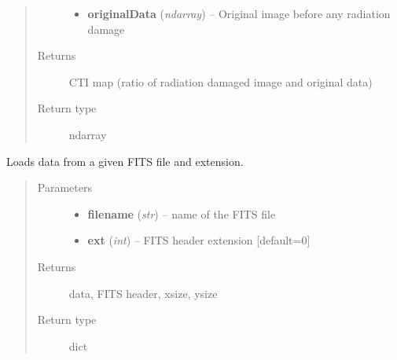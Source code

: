 \documentclass[a4paper,11pt,english]{sphinxmanual}
\begin{document}
\begin{fulllineitems}
\begin{fulllineitems}
\begin{quote}
\begin{description}
\begin{itemize}
\item {} 
\textbf{originalData} (\emph{ndarray}) -- Original image before any radiation damage

\end{itemize}

\item[{Returns}] \leavevmode
CTI map (ratio of radiation damaged image and original data)

\item[{Return type}] \leavevmode
ndarray

\end{description}\end{quote}

\end{fulllineitems}


\begin{fulllineitems}
\label{postproc:postproc.postprocessing.PostProcessing.loadFITS}
Loads data from a given FITS file and extension.
\begin{quote}\begin{description}
\item[{Parameters}] \leavevmode\begin{itemize}
\item {} 
\textbf{filename} (\emph{str}) -- name of the FITS file

\item {} 
\textbf{ext} (\emph{int}) -- FITS header extension {[}default=0{]}

\end{itemize}

\item[{Returns}] \leavevmode
data, FITS header, xsize, ysize

\item[{Return type}] \leavevmode
dict

\end{description}\end{quote}

\end{fulllineitems}



\end{fulllineitems}
\end{document}
